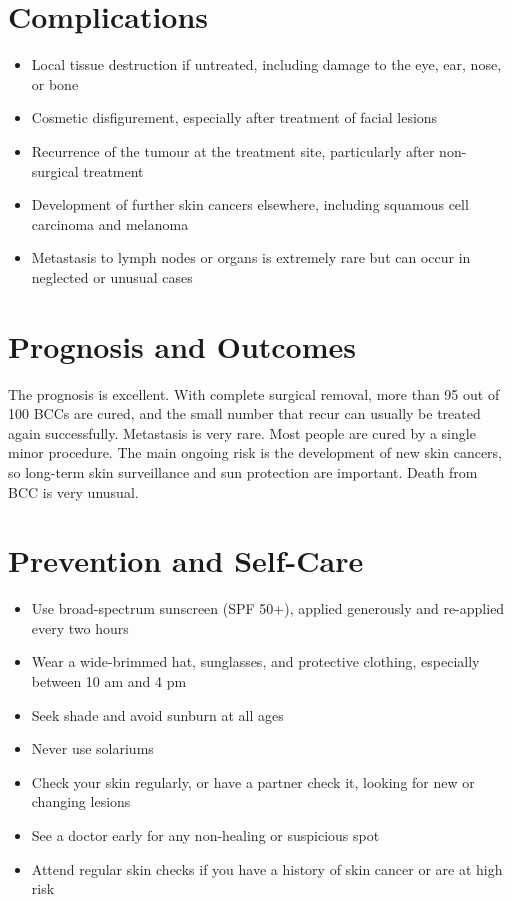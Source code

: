 \section*{Complications}
\begin{itemize}
    \item Local tissue destruction if untreated, including damage to the eye, ear, nose, or bone
    \item Cosmetic disfigurement, especially after treatment of facial lesions
    \item Recurrence of the tumour at the treatment site, particularly after non-surgical treatment
    \item Development of further skin cancers elsewhere, including squamous cell carcinoma and melanoma
    \item Metastasis to lymph nodes or organs is extremely rare but can occur in neglected or unusual cases
\end{itemize}

\section*{Prognosis and Outcomes}
The prognosis is excellent. With complete surgical removal, more than 95 out of 100 BCCs are cured, and the small number that recur can usually be treated again successfully. Metastasis is very rare. Most people are cured by a single minor procedure. The main ongoing risk is the development of new skin cancers, so long-term skin surveillance and sun protection are important. Death from BCC is very unusual.

\section*{Prevention and Self-Care}
\begin{itemize}
    \item Use broad-spectrum sunscreen (SPF 50+), applied generously and re-applied every two hours
    \item Wear a wide-brimmed hat, sunglasses, and protective clothing, especially between 10 am and 4 pm
    \item Seek shade and avoid sunburn at all ages
    \item Never use solariums
    \item Check your skin regularly, or have a partner check it, looking for new or changing lesions
    \item See a doctor early for any non-healing or suspicious spot
    \item Attend regular skin checks if you have a history of skin cancer or are at high risk
\end{itemize}

